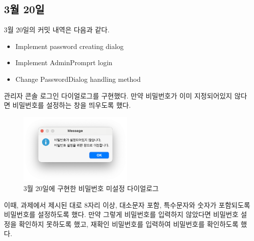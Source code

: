 \documentclass{oblivoir}
\begin{document}
    \subsection{3월 20일}

    3월 20일의 커밋 내역은 다음과 같다.

    \begin{itemize}
        \item Implement password creating dialog
        \item Implement AdminPromprt login
        \item Change PasswordDialog handling method
    \end{itemize}

    관리자 콘솔 로그인 다이얼로그를 구현했다.
    만약 비밀번호가 이미 지정되어있지 않다면 비밀번호를 설정하는 창을 띄우도록 했다.
    \begin{figure}[h]
        \centering
        \includegraphics[width=0.5\textwidth]{0320-password-not-set.png}
        \caption{3월 20일에 구현한 비밀번호 미설정 다이얼로그}
        \label{fig:0320-password-not-set}
    \end{figure}

    이때, 과제에서 제시된 대로 8자리 이상, 대소문자 포함, 특수문자와 숫자가 포함되도록
    비밀번호를 설정하도록 했다.
    만약 그렇게 비밀번호를 입력하지 않았다면 비밀번호 설정을 확인하지 못하도록 했고,
    재확인 비밀번호를 입력하여 비밀번호를 확인하도록 했다.
\end{document}
